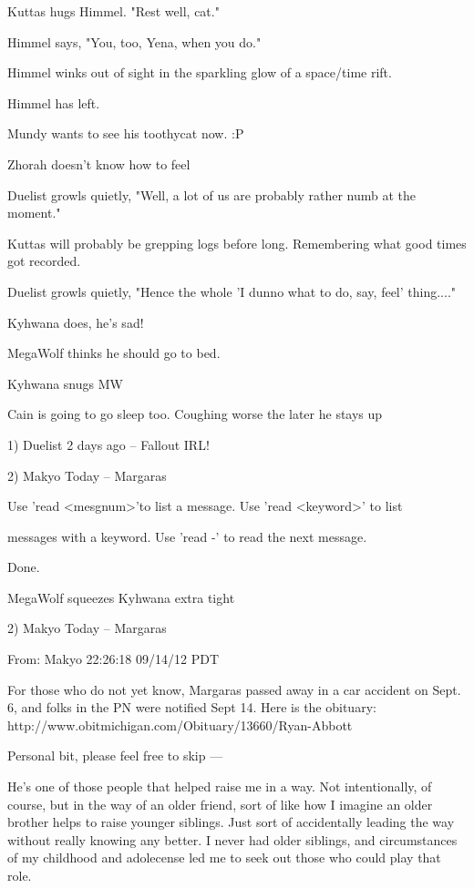 Kuttas hugs Himmel. "Rest well, cat."

Himmel says, "You, too, Yena, when you do."

Himmel winks out of sight in the sparkling glow of a space/time rift.

Himmel has left.

Mundy wants to see his toothycat now. :P

Zhorah doesn't know how to feel

Duelist growls quietly, "Well, a lot of us are probably rather numb at the moment."

Kuttas will probably be grepping logs before long. Remembering what good times got recorded.

Duelist growls quietly, "Hence the whole 'I dunno what to do, say, feel' thing...."

Kyhwana does, he's sad!

MegaWolf thinks he should go to bed.

Kyhwana snugs MW

Cain is going to go sleep too. Coughing worse the later he stays up

1) Duelist  2 days ago -- Fallout IRL!

2) Makyo  Today -- Margaras

Use 'read <mesgnum>'to list a message.  Use 'read <keyword>' to list

messages with a keyword.  Use 'read -' to read the next message.

Done.

MegaWolf squeezes Kyhwana extra tight

2) Makyo  Today -- Margaras

From: Makyo  22:26:18 09/14/12 PDT

\noindent For those who do not yet know, Margaras passed away in a car accident on Sept. 6, and folks in the PN were notified Sept 14.  Here is the obituary: http://www.obitmichigan.com/Obituary/13660/Ryan-Abbott

Personal bit, please feel free to skip ---

He's one of those people that helped raise me in a way.  Not intentionally, of course, but in the way of an older friend, sort of like how I imagine an older brother helps to raise younger siblings.  Just sort of accidentally leading the way without really knowing any better.  I never had older siblings, and circumstances of my childhood and adolecense led me to seek out those who could play that role.

